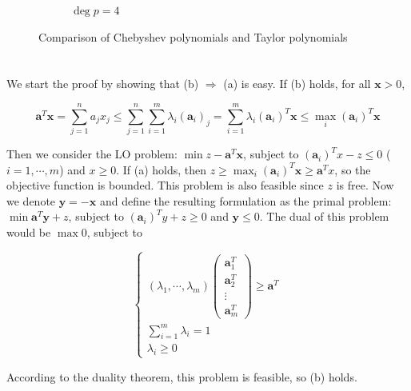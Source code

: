 \documentclass{article}
\newcommand{\x}{\bm x}
\newcommand{\y}{\bm y}
\renewcommand{\a}{\bm a}
\newcommand{\1}{\bm 1}
\begin{document}
\begin{figure}[!ht]
\begin{subfigure}[b]{0.48\textwidth}
        \caption{$\deg p=4$}
    \end{subfigure}
    \caption{Comparison of Chebyshev polynomials and Taylor polynomials}
\end{figure}

\section{}

We start the proof by showing that (b) $\Rightarrow$ (a) is easy. If (b) holds, for all $\x>0$,

$$
\a^T\x=\sum_{j=1}^na_jx_j
\le\sum_{j=1}^n\sum_{i=1}^m\lambda_i(\a_{i})_j
=\sum_{i=1}^m\lambda_i(\a_i)^T\x\le\max_i(\a_i)^T\x
$$

Then we consider the LO problem: $\min z-\a^T\x$, subject to $(\a_i)^Tx-z\le 0$ ($i=1,\cdots,m$) and $x\ge0$. If (a) holds, then $z\ge\max_i(\a_i)^T\x\ge\a^Tx$, so the objective function is bounded. This problem is also feasible since $z$ is free. Now we denote $\y=-\x$ and define the resulting formulation as the primal problem: $\min \a^T\y+z$, subject to $(\a_i)^Ty+z\ge 0$ and $\y\le 0$. The dual of this problem would be $\max 0$, subject to

$$
\begin{cases}
(\lambda_1,\cdots,\lambda_m)\begin{pmatrix}
    \a_1^T\\\a_2^T\\\vdots\\\a_m^T
\end{pmatrix}
\ge\a^T\\
\sum_{i=1}^m\lambda_i=1\\
\lambda_i\ge0
\end{cases}
$$

According to the duality theorem, this problem is feasible, so (b) holds.
\end{document}
